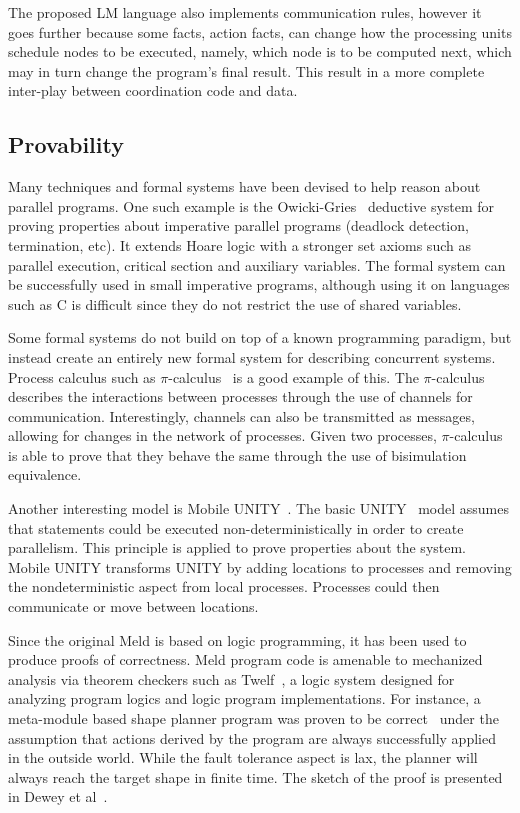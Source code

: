 The proposed LM language also implements communication rules, however it goes further because
some facts, action facts, can change how the processing units schedule nodes to be executed, namely, which node is to be computed next, which may in turn change
the program's final result. This result in a more complete inter-play between coordination code and data.

\subsection{Provability}

Many techniques and formal systems have been devised to help reason about parallel programs.
One such example is the Owicki-Gries~\cite{Owicki:1976:VPP:360051.360224} deductive system
for proving properties about imperative parallel programs (deadlock detection, termination, etc).
It extends Hoare logic with a stronger set axioms such as parallel execution, critical section
and auxiliary variables. The formal system can be successfully used in small imperative
programs, although using it on languages such as C is difficult since they do not
restrict the use of shared variables.

Some formal systems do not build on top of a known programming paradigm, but instead
create an entirely new formal system for describing concurrent systems. Process calculus
such as $\pi$-calculus~\cite{Milner:1999:CMS:329902} is a good example of this.
The $\pi$-calculus describes the interactions between processes
through the use of channels for communication. Interestingly, channels can also be transmitted as
messages, allowing for changes in the network of processes.
Given two processes, $\pi$-calculus is able to prove that they behave the same through
the use of bisimulation equivalence.

Another interesting model is Mobile UNITY~\cite{Roman97anintroduction}. The basic UNITY~\cite{UNITY} model assumes that statements could be executed non-deterministically
in order to create parallelism. This principle is applied to prove properties about
the system.
Mobile UNITY transforms UNITY by adding locations to processes and removing the
nondeterministic aspect from local processes. Processes could then communicate or move
between locations.

Since the original Meld is based on logic programming, it has been used to produce proofs of correctness.
Meld program code is amenable to mechanized analysis via theorem checkers such as Twelf~\cite{twelf},
a logic system designed for analyzing program logics and logic program implementations.
For instance, a meta-module based shape planner program was proven to be correct~\cite{dewey-iros08,ashley-rollman-iclp09}
under the assumption that actions derived by the program are always successfully applied in the outside world.
While the fault tolerance aspect is lax, the planner will always reach the target shape in finite time.
The sketch of the proof is presented in Dewey et al~\cite{dewey-iros08}.